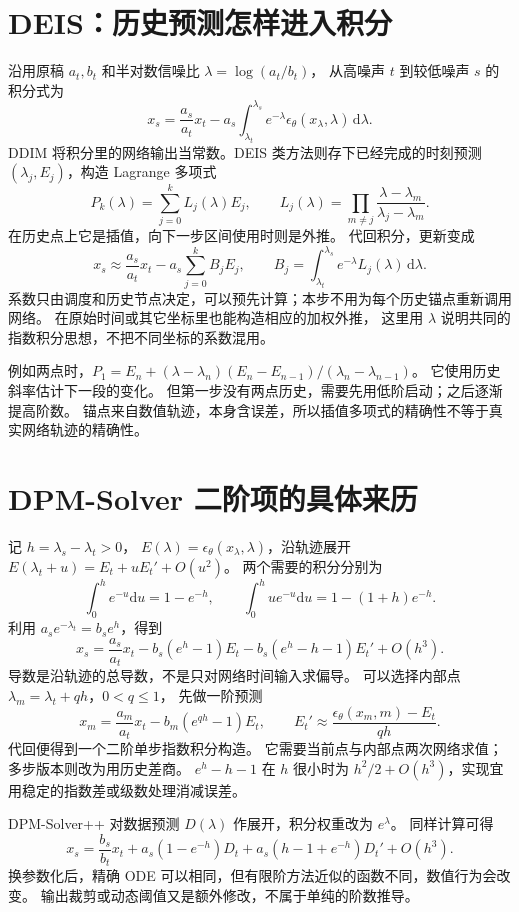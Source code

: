 \section{DEIS：历史预测怎样进入积分}
沿用原稿 $a_t,b_t$ 和半对数信噪比 $\lambda=\log(a_t/b_t)$，
从高噪声 $t$ 到较低噪声 $s$ 的积分式为
\[
x_s=\frac{a_s}{a_t}x_t-a_s\int_{\lambda_t}^{\lambda_s}
 e^{-\lambda}\epsilon_\theta(x_\lambda,\lambda)\,\mathrm d\lambda.
\]
DDIM 将积分里的网络输出当常数。DEIS 类方法则存下已经完成的时刻预测
$(\lambda_j,E_j)$，构造 Lagrange 多项式
\[
P_k(\lambda)=\sum_{j=0}^k L_j(\lambda)E_j,
\qquad L_j(\lambda)=\prod_{m\ne j}\frac{\lambda-\lambda_m}{\lambda_j-\lambda_m}.
\]
在历史点上它是插值，向下一步区间使用时则是外推。
代回积分，更新变成
\[
x_s\approx\frac{a_s}{a_t}x_t-a_s\sum_{j=0}^k B_jE_j,
\qquad B_j=\int_{\lambda_t}^{\lambda_s}e^{-\lambda}L_j(\lambda)\,\mathrm d\lambda.
\]
系数只由调度和历史节点决定，可以预先计算；本步不用为每个历史锚点重新调用网络。
在原始时间或其它坐标里也能构造相应的加权外推，
这里用 $\lambda$ 说明共同的指数积分思想，不把不同坐标的系数混用。

例如两点时，$P_1=E_n+(\lambda-\lambda_n)(E_n-E_{n-1})/(\lambda_n-\lambda_{n-1})$。
它使用历史斜率估计下一段的变化。
但第一步没有两点历史，需要先用低阶启动；之后逐渐提高阶数。
锚点来自数值轨迹，本身含误差，所以插值多项式的精确性不等于真实网络轨迹的精确性。

\section{DPM-Solver 二阶项的具体来历}
记 $h=\lambda_s-\lambda_t>0$，
$E(\lambda)=\epsilon_\theta(x_\lambda,\lambda)$，沿轨迹展开
$E(\lambda_t+u)=E_t+uE_t'+O(u^2)$。
两个需要的积分分别为
\[
\int_0^he^{-u}\mathrm du=1-e^{-h},\qquad
\int_0^hue^{-u}\mathrm du=1-(1+h)e^{-h}.
\]
利用 $a_se^{-\lambda_t}=b_se^h$，得到
\[
x_s=\frac{a_s}{a_t}x_t-b_s(e^h-1)E_t
 -b_s(e^h-h-1)E_t'+O(h^3).
\]
导数是沿轨迹的总导数，不是只对网络时间输入求偏导。
可以选择内部点 $\lambda_m=\lambda_t+qh$，$0<q\leq1$，
先做一阶预测
\[
x_m=\frac{a_m}{a_t}x_t-b_m(e^{qh}-1)E_t,
\qquad E_t'\approx\frac{\epsilon_\theta(x_m,m)-E_t}{qh}.
\]
代回便得到一个二阶单步指数积分构造。
它需要当前点与内部点两次网络求值；多步版本则改为用历史差商。
$e^h-h-1$ 在 $h$ 很小时为 $h^2/2+O(h^3)$，实现宜用稳定的指数差或级数处理消减误差。
\cite{dpm}

DPM-Solver++ 对数据预测 $D(\lambda)$ 作展开，积分权重改为 $e^\lambda$。
同样计算可得
\[
x_s=\frac{b_s}{b_t}x_t+a_s(1-e^{-h})D_t
 +a_s(h-1+e^{-h})D_t'+O(h^3).
\]
换参数化后，精确 ODE 可以相同，但有限阶方法近似的函数不同，数值行为会改变。
输出裁剪或动态阈值又是额外修改，不属于单纯的阶数推导。
\cite{dpmpp}

